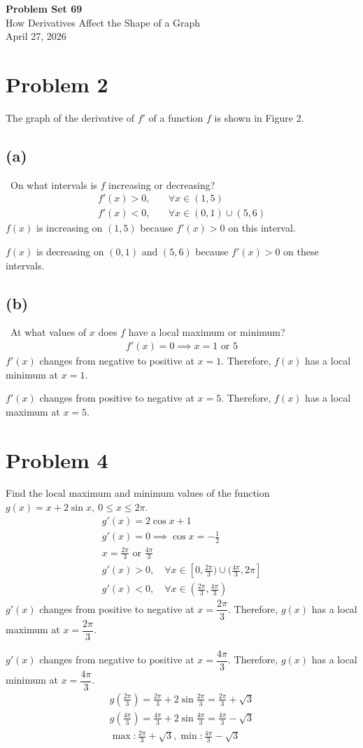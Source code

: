 \documentclass[12pt]{article}
\newcommand{\tor}{\text{ or }}
\newcommand{\vem}{\vspace{0.5em}}
\newcommand{\problem}[1]{\section{Problem #1}}
\newcommand{\subproblem}[1]{\subsection{(#1)} \,}
\begin{document}
\vspace*{0cm}

\begin{center}
    {\Large \bfseries Problem Set 69} \\[0.5cm]
    {\large How Derivatives Affect the Shape of a Graph} \\[0.35cm]
    {\normalsize April 27, 2026}
\end{center}


\problem{2}
The graph of the derivative of $f'$ of a function $f$ is shown in Figure 2. \vem

\subproblem{a}
On what intervals is $f$ increasing or decreasing?
\begin{align*}
    f'(x)>0, &\quad  \forall x\in (1,5)\\
    f'(x)<0, &\quad \forall x \in  (0,1) \cup (5,6)
\end{align*}
$f(x)$ is increasing on $(1,5)$ because $f'(x)>0$ on this interval. \vem

$f(x)$ is decreasing on $(0,1)$ and $(5,6)$ because $f'(x)>0$ on these intervals. \vem 

\subproblem{b}
At what values of $x$ does $f$ have a local maximum or minimum?
\begin{gather*}
    f'(x)=0 \implies x=1 \tor 5
\end{gather*}
$f'(x)$ changes from negative to positive at $x=1$. Therefore, $f(x)$ has a local minimum at $x=1$. \vem

$f'(x)$ changes from positive to negative at $x=5$. Therefore, $f(x)$ has a local maximum at $x=5$. \vem 

\problem{4}
Find the local maximum and minimum values of the function $g(x)=x+2 \sin x ,\  0 \le x \le 2\pi$.
\begin{gather*}
    g'(x)=2\cos x+1\\
    g'(x)=0 \implies \cos x=-\frac{1}{2}\\
    x=\frac{2\pi}{3} \tor \frac{4\pi}{3}\\
    g'(x)>0, \quad \forall x\in [0, \frac{2\pi}{3}) \cup (\frac{4\pi}{3}, 2\pi]\\
    g'(x)<0, \quad \forall x \in (\frac{2\pi}{3}, \frac{4\pi}{3})
\end{gather*}
$g'(x)$ changes from positive to negative at $x=\dfrac{2\pi}{3}$. Therefore, $g(x)$ has a local maximum at $x=\dfrac{2\pi}{3}$. \vem

$g'(x)$ changes from negative to positive at $x=\dfrac{4\pi}{3}$. Therefore, $g(x)$ has a local minimum at $x=\dfrac{4\pi}{3}$.
\begin{gather*}
    g(\frac{2\pi}{3})=\frac{2\pi}{3}+2\sin \frac{2\pi}{3}=\frac{2\pi}{3}+\sqrt{3}\\
    g(\frac{4\pi}{3})=\frac{4\pi}{3}+2\sin \frac{4\pi}{3}=\frac{4\pi}{3}-\sqrt{3}\\
    \boxed{\max: \frac{2\pi}{3}+\sqrt{3}, \min: \frac{4\pi}{3}-\sqrt{3}}
\end{gather*}
\end{document}
